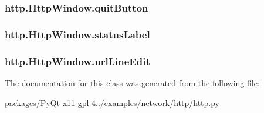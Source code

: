 \subsubsection[{quit\+Button}]{\setlength{\rightskip}{0pt plus 5cm}http.\+Http\+Window.\+quit\+Button}\label{classhttp_1_1HttpWindow_ae8980a54d4ad7f1dfc4c61dd69141f5c}
\hypertarget{classhttp_1_1HttpWindow_a1c7eadd65d217a1426a599b613f94602}{}
\subsubsection[{status\+Label}]{\setlength{\rightskip}{0pt plus 5cm}http.\+Http\+Window.\+status\+Label}\label{classhttp_1_1HttpWindow_a1c7eadd65d217a1426a599b613f94602}
\hypertarget{classhttp_1_1HttpWindow_a4eb57d8801b23eb5888e19e86d24894e}{}
\subsubsection[{url\+Line\+Edit}]{\setlength{\rightskip}{0pt plus 5cm}http.\+Http\+Window.\+url\+Line\+Edit}\label{classhttp_1_1HttpWindow_a4eb57d8801b23eb5888e19e86d24894e}


The documentation for this class was generated from the following file\+:\begin{DoxyCompactItemize}
\item 
packages/\+Py\+Qt-\/x11-\/gpl-\/4../examples/network/http/\hyperlink{http_8py}{http.\+py}\end{DoxyCompactItemize}
